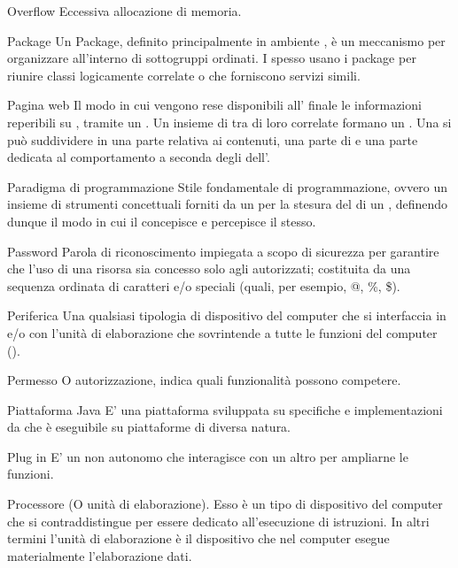 \elemento
{Overflow}
{Eccessiva allocazione di memoria.}


\elemento
{Package}
{Un Package, definito principalmente in ambiente , è un meccanismo per organizzare  all'interno di sottogruppi ordinati. I  spesso usano i package per riunire classi logicamente correlate o che forniscono servizi simili.}

\elemento
{Pagina web}
{Il modo in cui vengono rese disponibili all' finale le informazioni reperibili su , tramite un  . Un insieme di  tra di loro correlate formano un . Una  si può suddividere in una parte relativa ai contenuti, una parte di  e una parte dedicata al comportamento a seconda degli  dell'.
}

\elemento
{Paradigma di programmazione}
{Stile fondamentale di programmazione, ovvero un insieme di strumenti concettuali forniti da un  per la stesura del  di un , definendo dunque il modo in cui il  concepisce e percepisce il  stesso.}

\elemento
{Password}
{Parola di riconoscimento impiegata a scopo di sicurezza per garantire che l'uso di una risorsa sia concesso solo agli  autorizzati; costituita da una sequenza ordinata di caratteri  e/o speciali (quali, per esempio, @, \%, \$).}

\elemento
{Periferica}
{Una qualsiasi tipologia di dispositivo  del computer che si interfaccia in  e/o  con l'unità di elaborazione che sovrintende a tutte le funzioni del computer ().}

\elemento
{Permesso}
{O autorizzazione, indica quali funzionalità possono competere.}

\elemento
{Piattaforma Java}
{E' una piattaforma  sviluppata su specifiche e implementazioni da  che è eseguibile su piattaforme  di diversa natura.}

\elemento
{Plug in}
{E' un  non autonomo che interagisce con un altro  per ampliarne le funzioni.}

\elemento
{Processore}
{(O unità di elaborazione). Esso è un tipo di dispositivo  del computer che si contraddistingue per essere dedicato all'esecuzione di istruzioni. In altri termini l'unità di elaborazione è il dispositivo che nel computer esegue materialmente l'elaborazione dati.}

